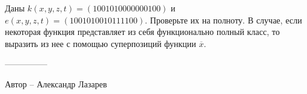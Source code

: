 \question
Даны $k(x, y, z, t) = (1001010000000100)$ и $e(x, y, z, t) = (1001010010111100)$. Проверьте их на полноту. В случае, если некоторая функция представляет из себя функционально полный класс, то выразить из нее с помощью суперпозиций функции $\overline{x}$.

---------------

Автор -- Александр Лазарев